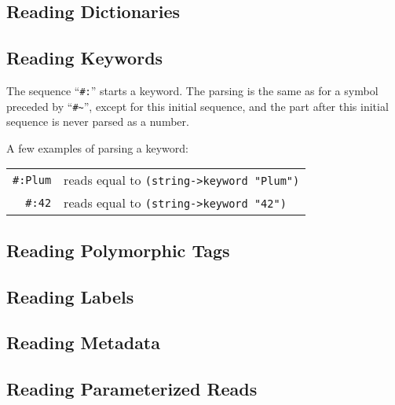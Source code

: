\subsection{Reading Dictionaries}
\label{subsec:aml-base-lang-reader-dictionaries}





\subsection{Reading Keywords}
\label{subsec:aml-base-lang-reader-keywords}

The sequence ``\lstinline!#:!'' starts a keyword. The parsing is the same as for a symbol preceded by ``\lstinline!#~!'', except for this initial sequence, and the part after this initial sequence is never parsed as a number. 

\example A few examples of parsing a keyword:

\begin{tabular}{ r l }
  \lstinline!#:Plum! & reads equal to \lstinline!(string->keyword "Plum")! \\
  \lstinline!#:42! & reads equal to \lstinline!(string->keyword "42")! \\
\end{tabular}







\subsection{Reading Polymorphic Tags}
\label{subsec:aml-base-lang-reader-polytags}





\subsection{Reading Labels}
\label{subsec:aml-base-lang-reader-labels}





\subsection{Reading Metadata}
\label{subsec:aml-base-lang-reader-metadata}





\subsection{Reading Parameterized Reads}
\label{subsec:aml-base-lang-reader-parameterized-reads}





